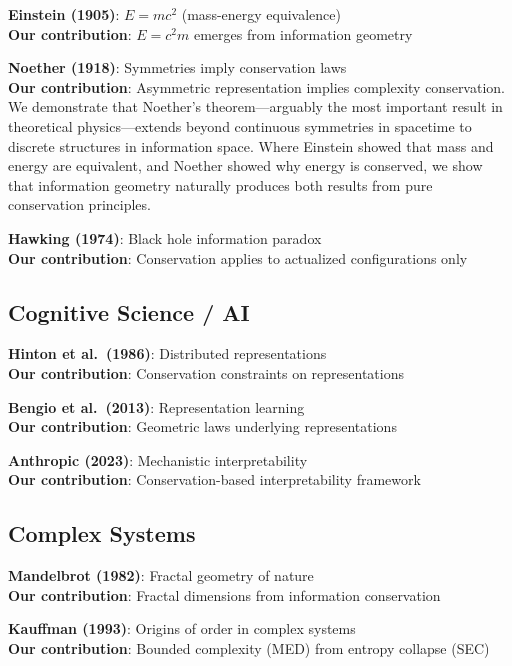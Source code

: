 \documentclass[11pt,a4paper]{article}
\begin{document}
\textbf{Einstein (1905)}: $E = mc^2$ (mass-energy equivalence)\\
\textbf{Our contribution}: $E = c^2m$ emerges from information geometry

\textbf{Noether (1918)}: Symmetries imply conservation laws\\
\textbf{Our contribution}: Asymmetric representation implies complexity conservation. We demonstrate that Noether's theorem---arguably the most important result in theoretical physics---extends beyond continuous symmetries in spacetime to discrete structures in information space. Where Einstein showed that mass and energy are equivalent, and Noether showed why energy is conserved, we show that information geometry naturally produces both results from pure conservation principles.

\textbf{Hawking (1974)}: Black hole information paradox\\
\textbf{Our contribution}: Conservation applies to actualized configurations only

\subsection{Cognitive Science / AI}

\textbf{Hinton et al.\ (1986)}: Distributed representations\\
\textbf{Our contribution}: Conservation constraints on representations

\textbf{Bengio et al.\ (2013)}: Representation learning\\
\textbf{Our contribution}: Geometric laws underlying representations

\textbf{Anthropic (2023)}: Mechanistic interpretability\\
\textbf{Our contribution}: Conservation-based interpretability framework

\subsection{Complex Systems}

\textbf{Mandelbrot (1982)}: Fractal geometry of nature\\
\textbf{Our contribution}: Fractal dimensions from information conservation

\textbf{Kauffman (1993)}: Origins of order in complex systems\\
\textbf{Our contribution}: Bounded complexity (MED) from entropy collapse (SEC)
\end{document}
